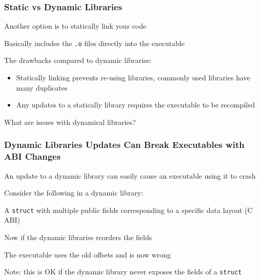 \documentclass[aspectratio=169]{beamer}
\begin{document}
  \begin{frame}
    \frametitle{Static vs Dynamic Libraries}

    Another option is to statically link your code

    \hspace{1em} Basically includes the \texttt{.o} files directly into the
    executable

    \vspace{2em}

    The drawbacks compared to dynamic libraries:
    \begin{itemize}
      \item Statically linking prevents re-using libraries, commonly used
            libraries have many duplicates
      \item Any updates to a statically library requires the executable to be
            recompiled
    \end{itemize}

    \vspace{2em}

    What are issues with dynamical libraries?
  \end{frame}

  \begin{frame}
    \frametitle{Dynamic Libraries Updates Can Break Executables with ABI
                Changes}

    An update to a dynamic library can easily cause an executable using it to
    crash

    \vspace{1em}

    Consider the following in a dynamic library:

    \hspace{1em} A \texttt{struct} with multiple public fields corresponding to
    a specific data layout (C ABI)

    \vspace{1em}


    \vspace{1em}

    Now if the dynamic libraries reorders the fields

    \hspace{1em} The executable uses the old offsets and is now wrong

    \vspace{1em}

    Note: this is OK if the dynamic library never exposes the fields of a
    \texttt{struct}
  \end{frame}
\end{document}
